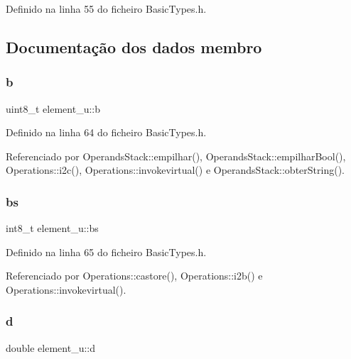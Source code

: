 Definido na linha 55 do ficheiro Basic\+Types.\+h.



\subsection{Documentação dos dados membro}
\mbox{\label{unionelement__u_a53d82c8469f011fdb1e35f88738aaf5e}} 
\subsubsection{\texorpdfstring{b}{b}}
{\footnotesize\ttfamily uint8\+\_\+t element\+\_\+u\+::b}



Definido na linha 64 do ficheiro Basic\+Types.\+h.



Referenciado por Operands\+Stack\+::empilhar(), Operands\+Stack\+::empilhar\+Bool(), Operations\+::i2c(), Operations\+::invokevirtual() e Operands\+Stack\+::obter\+String().

\mbox{\label{unionelement__u_ae2cf2a77222a37a817fba0e70266ddf6}} 
\subsubsection{\texorpdfstring{bs}{bs}}
{\footnotesize\ttfamily int8\+\_\+t element\+\_\+u\+::bs}



Definido na linha 65 do ficheiro Basic\+Types.\+h.



Referenciado por Operations\+::castore(), Operations\+::i2b() e Operations\+::invokevirtual().

\mbox{\label{unionelement__u_a055cfbd7f84724337a2cb16acdedab90}} 
\subsubsection{\texorpdfstring{d}{d}}
{\footnotesize\ttfamily double element\+\_\+u\+::d}



